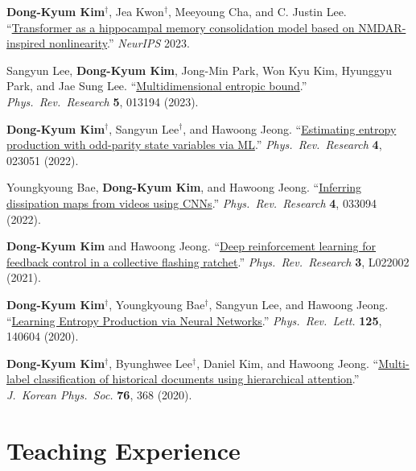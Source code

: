 \documentclass[11pt,letterpaper]{article}
\begin{document}
{\begin{enumerate}[label={[\arabic*]}, leftmargin=20pt, itemsep=2pt]
    \item \textbf{Dong-Kyum Kim}$^\dagger$, Jea Kwon$^\dagger$, Meeyoung Cha, and C. Justin Lee.
    ``\href{https://openreview.net/forum?id=vKpVJxplmB}{Transformer as a hippocampal memory consolidation model based on
NMDAR-inspired nonlinearity}.''
    \textit{NeurIPS} 2023.

    \item Sangyun Lee, \textbf{Dong-Kyum Kim}, Jong-Min Park, Won Kyu Kim, Hyunggyu Park, and Jae Sung Lee.
    ``\href{https://doi.org/10.1103/PhysRevResearch.5.013194}{Multidimensional entropic bound}.''
    \textit{Phys.\ Rev.\ Research} \textbf{5}, 013194 (2023).

    \item \textbf{Dong-Kyum Kim}$^\dagger$, Sangyun Lee$^\dagger$, and Hawoong Jeong.
    ``\href{https://doi.org/10.1103/PhysRevResearch.4.023051}{Estimating entropy production with odd-parity state
variables via ML}.''
    \textit{Phys.\ Rev.\ Research} \textbf{4}, 023051 (2022).

    \item Youngkyoung Bae, \textbf{Dong-Kyum Kim}, and Hawoong Jeong.
    ``\href{https://doi.org/10.1103/PhysRevResearch.4.033094}{Inferring dissipation maps from videos using CNNs}.''
    \textit{Phys.\ Rev.\ Research} \textbf{4}, 033094 (2022).

    \item \textbf{Dong-Kyum Kim} and Hawoong Jeong.
    ``\href{https://doi.org/10.1103/PhysRevResearch.3.L022002}{Deep reinforcement learning for feedback control in a
collective flashing ratchet}.''
    \textit{Phys.\ Rev.\ Research} \textbf{3}, L022002 (2021).

    \item \textbf{Dong-Kyum Kim}$^\dagger$, Youngkyoung Bae$^\dagger$, Sangyun Lee, and Hawoong Jeong.
    ``\href{https://doi.org/10.1103/PhysRevLett.125.140604}{Learning Entropy Production via Neural Networks}.''
    \textit{Phys.\ Rev.\ Lett.} \textbf{125}, 140604 (2020).

    \item \textbf{Dong-Kyum Kim}$^\dagger$, Byunghwee Lee$^\dagger$, Daniel Kim, and Hawoong Jeong.
    ``\href{https://doi.org/10.3938/jkps.76.368}{Multi-label classification of historical documents using hierarchical
attention}.''
    \textit{J.\ Korean Phys.\ Soc.} \textbf{76}, 368 (2020).

\end{enumerate}
}

\section{Teaching Experience}
\end{document}

